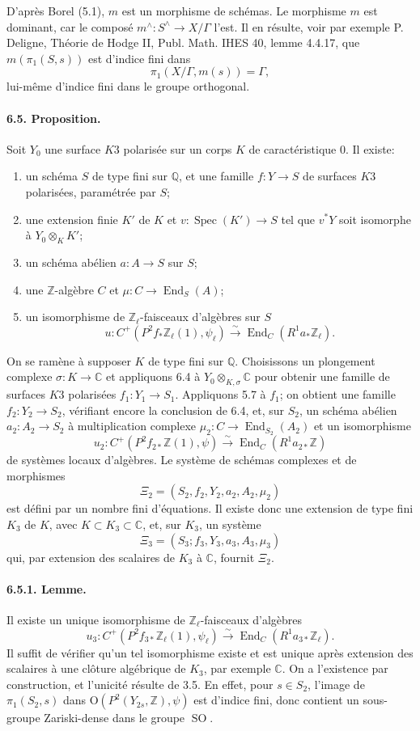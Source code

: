 \documentclass[10pt]{article}
\newcommand{\C}{\mathbb{C}}
\newcommand{\Q}{\mathbb{Q}}
\newcommand{\Z}{\mathbb{Z}}
\newcommand{\Spec}{\operatorname{Spec}}
\newcommand{\End}{\operatorname{End}}
\newcommand{\SO}{\operatorname{SO}}
\newcommand{\iso}{\xrightarrow{\sim}}
\begin{document}
D'après Borel (5.1), $m$ est un morphisme de schémas. Le morphisme $m$ est dominant, car le composé $m^\wedge:S^\wedge\to X/\Gamma$ l'est. Il en résulte, voir par exemple P. Deligne, Théorie de Hodge II, Publ. Math. IHES 40, lemme 4.4.17, que $m(\pi_1(S,s))$ est d'indice fini dans
\[
\pi_1(X/\Gamma,m(s))=\Gamma,
\]
lui-même d'indice fini dans le groupe orthogonal.

\paragraph{6.5. Proposition.} Soit $Y_0$ une surface $K3$ polarisée sur un corps $K$ de caractéristique $0$. Il existe:
\begin{enumerate}[label=\alph*)]
\item un schéma $S$ de type fini sur $\Q$, et une famille $f:Y\to S$ de surfaces $K3$ polarisées, paramétrée par $S$;
\item une extension finie $K'$ de $K$ et $v:\Spec(K')\to S$ tel que $v^*Y$ soit isomorphe à $Y_0\otimes_K K'$;
\item un schéma abélien $a:A\to S$ sur $S$;
\item une $\Z$-algèbre $C$ et $\mu:C\to\End_S(A)$;
\item un isomorphisme de $\Z_\ell$-faisceaux d'algèbres sur $S$
\[
u:C^+(P^2f_*\Z_\ell(1),\psi_\ell)\iso \End_C(R^1a_*\Z_\ell).
\]
\end{enumerate}

On se ramène à supposer $K$ de type fini sur $\Q$. Choisissons un plongement complexe $\sigma:K\to\C$ et appliquons 6.4 à $Y_0\otimes_{K,\sigma}\C$ pour obtenir une famille de surfaces $K3$ polarisées $f_1:Y_1\to S_1$. Appliquons 5.7 à $f_1$; on obtient une famille $f_2:Y_2\to S_2$, vérifiant encore la conclusion de 6.4, et, sur $S_2$, un schéma abélien $a_2:A_2\to S_2$ à multiplication complexe $\mu_2:C\to\End_{S_2}(A_2)$ et un isomorphisme
\[
u_2:C^+(P^2f_{2*}\Z(1),\psi)\iso \End_C(R^1a_{2*}\Z)
\]
de systèmes locaux d'algèbres. Le système de schémas complexes et de morphismes
\[
\Xi_2=(S_2,f_2,Y_2,a_2,A_2,\mu_2)
\]
est défini par un nombre fini d'équations. Il existe donc une extension de type fini $K_3$ de $K$, avec $K\subset K_3\subset\C$, et, sur $K_3$, un système
\[
\Xi_3=(S_3;f_3,Y_3,a_3,A_3,\mu_3)
\]
qui, par extension des scalaires de $K_3$ à $\C$, fournit $\Xi_2$.

\paragraph{6.5.1. Lemme.} Il existe un unique isomorphisme de $\Z_\ell$-faisceaux d'algèbres
\[
u_3:C^+(P^2f_{3*}\Z_\ell(1),\psi_\ell)\iso
\End_C(R^1a_{3*}\Z_\ell).
\]
Il suffit de vérifier qu'un tel isomorphisme existe et est unique après extension des scalaires à une clôture algébrique de $K_3$, par exemple $\C$. On a l'existence par construction, et l'unicité résulte de 3.5. En effet, pour $s\in S_2$, l'image de $\pi_1(S_2,s)$ dans $\mathrm O(P^2(Y_{2s},\Z),\psi)$ est d'indice fini, donc contient un sous-groupe Zariski-dense dans le groupe $\SO$.
\end{document}
